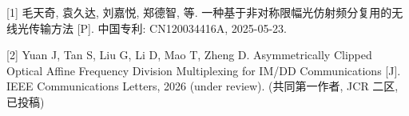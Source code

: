 


\begin{publications}

  [1] 毛天奇, 袁久达, 刘嘉悦, 郑德智, 等. 一种基于非对称限幅光仿射频分复用的无线光传输方法 [P]. 中国专利: CN120034416A, 2025-05-23.

  [2] Yuan J, Tan S, Liu G, Li D, Mao T, Zheng D. Asymmetrically Clipped Optical Affine Frequency Division Multiplexing for IM/DD Communications [J]. IEEE Communications Letters, 2026 (under review). (共同第一作者, JCR 二区, 已投稿)

\end{publications}
